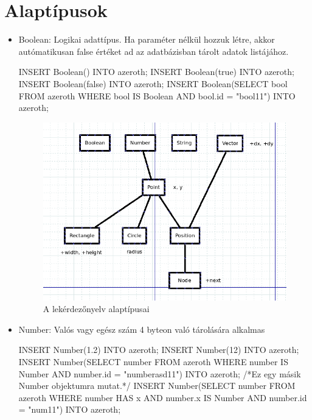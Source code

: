 
\section{Alaptípusok}

\begin{itemize}

\item Boolean: Logikai adattípus.
 Ha paraméter nélkül hozzuk létre, akkor autómatikusan false értéket ad az adatbázisban tárolt adatok listájához.

\begin{sql}
INSERT Boolean() INTO azeroth;
INSERT Boolean(true) INTO azeroth; 
INSERT Boolean(false) INTO azeroth;
INSERT Boolean(SELECT bool FROM azeroth WHERE bool IS Boolean AND bool.id = "bool11") INTO azeroth;
\end{sql}



\begin{figure}[htb]
\begin{center}
    \includegraphics[scale=0.5]{images/types}
    \caption{A lekérdezőnyelv alaptípusai}
    \label{fig:types}
\end{center}
\end{figure}

\item Number: Valós vagy egész szám 4 byteon való tárolására alkalmas
\begin{sql}
INSERT Number(1.2) INTO azeroth;
INSERT Number(12) INTO azeroth;
INSERT Number(SELECT number FROM azeroth WHERE number IS Number AND number.id = "numberasd11") INTO azeroth; /*Ez egy másik Number objektumra mutat.*/
INSERT Number(SELECT number FROM azeroth WHERE number HAS x AND number.x IS Number AND number.id = "num11") INTO azeroth;
\end{sql}


\end{itemize}
